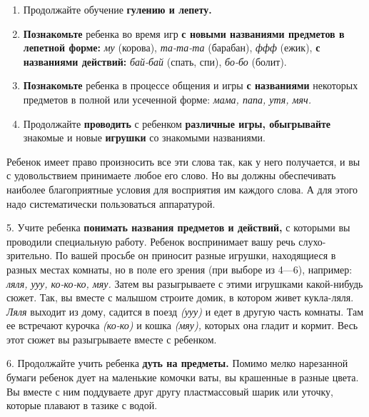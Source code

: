 \documentclass[a5paper]{book}
\renewcommand{\emph}[1]{\textit{#1}}
\begin{document}
\begin{enumerate}
\def\labelenumi{\arabic{enumi}.}
\item
  
  Продолжайте обучение \textbf{гулению и лепету.}
  
\item
  
  \textbf{Познакомьте} ребенка во время игр \textbf{с новыми названиями
  предметов в лепетной форме:} \emph{му} (корова), \emph{та-та-та}
  (барабан), \emph{ффф} (ежик), \textbf{с названиями действий:}
  \emph{бай-бай} (спать, спи), \emph{бо-бо} (болит).
  
\item
  
  \textbf{Познакомьте} ребенка в процессе общения и игры \textbf{с
  названиями} некоторых предметов в полной или усеченной форме:
  \emph{мама, папа, утя, мяч.}
  
\item
  
  Продолжайте \textbf{проводить} с ребенком \textbf{различные игры,
  обыгрывайте} знакомые и новые \textbf{игрушки} со знакомыми
  названиями.
  
\end{enumerate}


Ребенок имеет право произносить все эти слова так, как у него
получается, и вы с удовольствием принимаете любое его слово. Но вы
должны обеспечивать наиболее благоприятные условия для восприятия им
каждого слова. А для этого надо систематически пользоваться аппаратурой.

5. Учите ребенка \textbf{понимать названия предметов и действий,} с
которыми вы проводили специальную работу. Ребенок воспринимает вашу речь
слухо-зрительно. По вашей просьбе он приносит разные игрушки,
находящиеся в разных местах комнаты, но в поле его зрения (при выборе из
4---6), например: \emph{ляля, ууу, ко-ко-ко, мяу.} Затем вы разыгрываете
с этими игрушками какой-нибудь сюжет. Так, вы вместе с малышом строите
домик, в котором живет кукла-ляля. \emph{Ляля} выходит из дому, садится
в поезд \emph{(ууу)} и едет в другую часть комнаты. Там ее встречают
курочка \emph{(ко-ко)} и кошка \emph{(мяу),} которых она гладит и
кормит. Весь этот сюжет вы разыгрываете вместе с ребенком.

6. Продолжайте учить ребенка \textbf{дуть на предметы.} Помимо мелко
нарезанной бумаги ребенок дует на маленькие комочки ваты, вы крашенные в
разные цвета. Вы вместе с ним поддуваете друг другу пластмассовый шарик
или уточку, которые плавают в тазике с водой.
\end{document}
